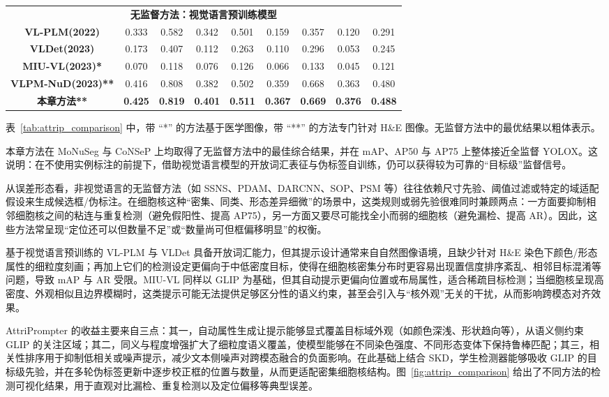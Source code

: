 \begin{table}[t]
\begin{center}
{\begin{tabular}{ccccccccc}
\multicolumn{9}{c}{\textbf{无监督方法：视觉语言预训练模型}} \\
\textbf{VL-PLM(2022)\cite{zhao2022exploiting}} & 0.333 & 0.582 & 0.342 & 0.501 & 0.159 & 0.357 & 0.120 & 0.291 \\
\textbf{VLDet(2023)\cite{lin2022learning}} & 0.173 & 0.407 & 0.112 & 0.263 & 0.110 & 0.296 & 0.053 & 0.245 \\
\textbf{MIU-VL(2023)*\cite{qin2022medical}} & 0.070 & 0.118 & 0.076 & 0.126 & 0.066 & 0.133 & 0.045 & 0.121 \\
\textbf{VLPM-NuD(2023)**\cite{wu2023zeroshot}} & 0.416 & 0.808 & 0.382 & 0.502 & 0.359 & 0.668 & 0.363 & 0.480 \\
\textbf{本章方法**} & \textbf{0.425} & \textbf{0.819} & \textbf{0.401} & \textbf{0.511} & \textbf{0.367} & \textbf{0.669} & \textbf{0.376} & \textbf{0.488} \\ \bottomrule[1.5pt]
\end{tabular}
}
\end{center}
\end{table}
表~\ref{tab:attrip_comparison} 中，带 ``*'' 的方法基于医学图像，带 ``**'' 的方法专门针对 H\&E 图像。无监督方法中的最优结果以粗体表示。


本章方法在 MoNuSeg 与 CoNSeP 上均取得了无监督方法中的最佳综合结果，并在 mAP、AP50 与 AP75 上整体接近全监督 YOLOX。这说明：在不使用实例标注的前提下，借助视觉语言模型的开放词汇表征与伪标签自训练，仍可以获得较为可靠的“目标级”监督信号。

从误差形态看，非视觉语言的无监督方法（如 SSNS、PDAM、DARCNN、SOP、PSM 等）往往依赖尺寸先验、阈值过滤或特定的域适配假设来生成候选框/伪标注。在细胞核这种“密集、同类、形态差异细微”的场景中，这类规则或弱先验很难同时兼顾两点：一方面要抑制相邻细胞核之间的粘连与重复检测（避免假阳性、提高 AP75），另一方面又要尽可能找全小而弱的细胞核（避免漏检、提高 AR）。因此，这些方法常呈现“定位还可以但数量不足”或“数量尚可但框偏移明显”的权衡。

基于视觉语言预训练的 VL-PLM 与 VLDet 具备开放词汇能力，但其提示设计通常来自自然图像语境，且缺少针对 H\&E 染色下颜色/形态属性的细粒度刻画；再加上它们的检测设定更偏向于中低密度目标，使得在细胞核密集分布时更容易出现置信度排序紊乱、相邻目标混淆等问题，导致 mAP 与 AR 受限。MIU-VL 同样以 GLIP 为基础，但其自动提示更偏向位置或布局属性，适合稀疏目标检测；当细胞核呈现高密度、外观相似且边界模糊时，这类提示可能无法提供足够区分性的语义约束，甚至会引入与“核外观”无关的干扰，从而影响跨模态对齐效果。

AttriPrompter 的收益主要来自三点：其一，自动属性生成让提示能够显式覆盖目标域外观（如颜色深浅、形状趋向等），从语义侧约束 GLIP 的关注区域；其二，同义与程度增强扩大了细粒度语义覆盖，使模型能够在不同染色强度、不同形态变体下保持鲁棒匹配；其三，相关性排序用于抑制低相关或噪声提示，减少文本侧噪声对跨模态融合的负面影响。在此基础上结合 SKD，学生检测器能够吸收 GLIP 的目标级先验，并在多轮伪标签更新中逐步校正框的位置与数量，从而更适配密集细胞核结构。图~\ref{fig:attrip_comparison} 给出了不同方法的检测可视化结果，用于直观对比漏检、重复检测以及定位偏移等典型误差。

